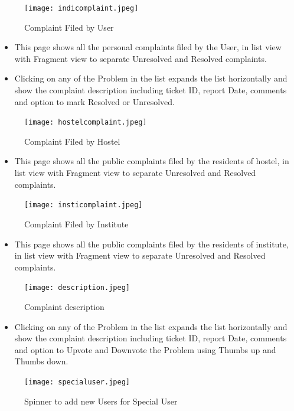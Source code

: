 \documentclass[12pt]{article}
\begin{document}
\begin{figure}[!ht]
	\centering
	\texttt{[image: indicomplaint.jpeg]}
	\caption{Complaint Filed by User}
\end{figure}
\begin{itemize}
    \item This page shows all the personal complaints filed by the User, in list view with Fragment view to separate Unresolved and Resolved complaints.
    \item Clicking on any of the Problem in the list expands the list horizontally and show the complaint description including ticket ID, report Date, comments and option to mark Resolved or Unresolved.
\end{itemize}


\begin{figure}[!ht]
	\centering
	\texttt{[image: hostelcomplaint.jpeg]}
	\caption{Complaint Filed by Hostel}
\end{figure}
\begin{itemize}
    \item This page shows all the public complaints filed by the residents of hostel, in list view with Fragment view to separate Unresolved and Resolved complaints.
\end{itemize}

\begin{figure}[!ht]
	\centering
	\texttt{[image: insticomplaint.jpeg]}
	\caption{Complaint Filed by Institute}
\end{figure}
\begin{itemize}
    \item This page shows all the public complaints filed by the residents of institute, in list view with Fragment view to separate Unresolved and Resolved complaints.
\end{itemize}


\begin{figure}[!ht]
	\centering
	\texttt{[image: description.jpeg]}
	\caption{Complaint description}
\end{figure}
\begin{itemize}
    \item Clicking on any of the Problem in the list expands the list horizontally and show the complaint description including ticket ID, report Date, comments and option to Upvote and Downvote the Problem using Thumbs up and Thumbs down.
\end{itemize}

\begin{figure}[!ht]
	\centering
	\texttt{[image: specialuser.jpeg]}
	\caption{Spinner to add new Users for Special User}
\end{figure}
\end{document}
